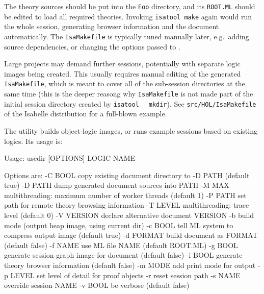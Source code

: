 \begin{isabellebody}
\begin{isamarkuptext}
  \noindent The theory sources should be put into the \verb|Foo|
  directory, and its \verb|ROOT.ML| should be edited to load all
  required theories.  Invoking \verb|isatool make| again would
  run the whole session, generating browser information and the
  document automatically.  The \verb|IsaMakefile| is typically
  tuned manually later, e.g.\ adding source dependencies, or changing
  the options passed to \hyperlink{tool.usedir}{\mbox{}}.

  \medskip Large projects may demand further sessions, potentially
  with separate logic images being created.  This usually requires
  manual editing of the generated \verb|IsaMakefile|, which is
  meant to cover all of the sub-session directories at the same time
  (this is the deeper reasong why \verb|IsaMakefile| is not made
  part of the initial session directory created by \verb|isatool|\isasep\isanewline%
\verb|  mkdir|).  See \verb|src/HOL/IsaMakefile| of the Isabelle
  distribution for a full-blown example.%
\end{isamarkuptext}%
\isamarkuptrue%
%
\isamarkuptrue%
%
\begin{isamarkuptext}%
The \hypertarget{tool.usedir}{\hyperlink{tool.usedir}{\mbox{}}} utility builds object-logic images, or runs
  example sessions based on existing logics. Its usage is:
\begin{ttbox}

Usage: usedir [OPTIONS] LOGIC NAME

  Options are:
    -C BOOL      copy existing document directory to -D PATH (default true)
    -D PATH      dump generated document sources into PATH
    -M MAX       multithreading: maximum number of worker threads (default 1)
    -P PATH      set path for remote theory browsing information
    -T LEVEL     multithreading: trace level (default 0)
    -V VERSION   declare alternative document VERSION
    -b           build mode (output heap image, using current dir)
    -c BOOL      tell ML system to compress output image (default true)
    -d FORMAT    build document as FORMAT (default false)
    -f NAME      use ML file NAME (default ROOT.ML)
    -g BOOL      generate session graph image for document (default false)
    -i BOOL      generate theory browser information (default false)
    -m MODE      add print mode for output
    -p LEVEL     set level of detail for proof objects
    -r           reset session path
    -s NAME      override session NAME
    -v BOOL      be verbose (default false)


\end{ttbox}
\end{isamarkuptext}
\end{isabellebody}
